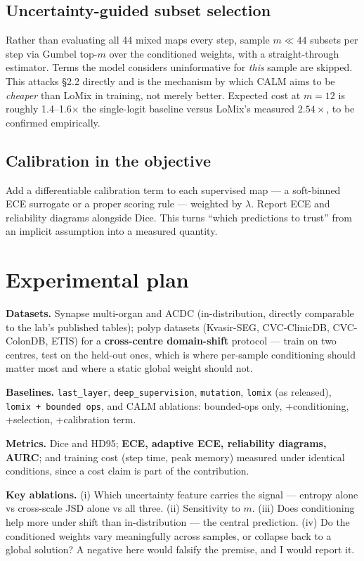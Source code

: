 \documentclass[11pt,a4paper]{article}
\newcommand{\code}[1]{\texttt{\small #1}}
\begin{document}
\subsection{Uncertainty-guided subset selection}

Rather than evaluating all 44 mixed maps every step, sample $m \ll 44$ subsets
per step via Gumbel top-$m$ over the conditioned weights, with a
straight-through estimator. Terms the model considers uninformative for
\emph{this} sample are skipped. This attacks \S2.2 directly and is the mechanism
by which CALM aims to be \emph{cheaper} than LoMix in training, not merely
better. Expected cost at $m = 12$ is roughly 1.4--1.6$\times$ the single-logit
baseline versus LoMix's measured $2.54\times$, to be confirmed empirically.

\subsection{Calibration in the objective}

Add a differentiable calibration term to each supervised map --- a soft-binned
ECE surrogate or a proper scoring rule --- weighted by $\lambda$. Report ECE and
reliability diagrams alongside Dice. This turns ``which predictions to trust''
from an implicit assumption into a measured quantity.

\section{Experimental plan}

\textbf{Datasets.} Synapse multi-organ and ACDC (in-distribution, directly
comparable to the lab's published tables); polyp datasets (Kvasir-SEG,
CVC-ClinicDB, CVC-ColonDB, ETIS) for a \textbf{cross-centre domain-shift}
protocol --- train on two centres, test on the held-out ones, which is where
per-sample conditioning should matter most and where a static global weight
should not.

\textbf{Baselines.} \code{last\_layer}, \code{deep\_supervision},
\code{mutation}, \code{lomix} (as released), \code{lomix + bounded ops}, and
CALM ablations: bounded-ops only, +conditioning, +selection, +calibration term.

\textbf{Metrics.} Dice and HD95; \textbf{ECE, adaptive ECE, reliability
diagrams, AURC}; and training cost (step time, peak memory) measured under
identical conditions, since a cost claim is part of the contribution.

\textbf{Key ablations.} (i) Which uncertainty feature carries the signal ---
entropy alone vs cross-scale JSD alone vs all three. (ii) Sensitivity to $m$.
(iii) Does conditioning help more under shift than in-distribution --- the
central prediction. (iv) Do the conditioned weights vary meaningfully across
samples, or collapse back to a global solution? A negative here would falsify
the premise, and I would report it.
\end{document}
